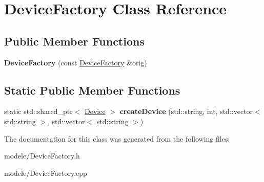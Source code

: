\hypertarget{class_device_factory}{\section{Device\-Factory Class Reference}
\label{class_device_factory}
}
\subsection*{Public Member Functions}
\begin{DoxyCompactItemize}
\item 
\hypertarget{class_device_factory_ab6c9f73aa7d543eeeb2b6791964ba5ba}{{\bfseries Device\-Factory} (const \hyperlink{class_device_factory}{Device\-Factory} \&orig)}\label{class_device_factory_ab6c9f73aa7d543eeeb2b6791964ba5ba}

\end{DoxyCompactItemize}
\subsection*{Static Public Member Functions}
\begin{DoxyCompactItemize}
\item 
\hypertarget{class_device_factory_a08a4fd0e0103d2e342db3b7c78a77574}{static std\-::shared\-\_\-ptr$<$ \hyperlink{class_device}{Device} $>$ {\bfseries create\-Device} (std\-::string, int, std\-::vector$<$ std\-::string $>$, std\-::vector$<$ std\-::string $>$)}\label{class_device_factory_a08a4fd0e0103d2e342db3b7c78a77574}

\end{DoxyCompactItemize}


The documentation for this class was generated from the following files\-:\begin{DoxyCompactItemize}
\item 
modele/Device\-Factory.\-h\item 
modele/Device\-Factory.\-cpp\end{DoxyCompactItemize}
